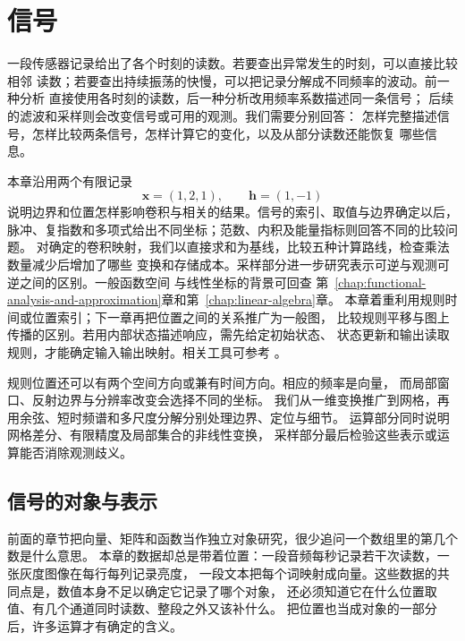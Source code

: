 \chapter{信号}
\label{chap:signal-analysis}

一段传感器记录给出了各个时刻的读数。若要查出异常发生的时刻，可以直接比较相邻
读数；若要查出持续振荡的快慢，可以把记录分解成不同频率的波动。前一种分析
直接使用各时刻的读数，后一种分析改用频率系数描述同一条信号；
后续的滤波和采样则会改变信号或可用的观测。我们需要分别回答：
怎样完整描述信号，怎样比较两条信号，怎样计算它的变化，以及从部分读数还能恢复
哪些信息。

本章沿用两个有限记录
\begin{equation}
  \bm x=(1,2,1),\qquad \bm h=(1,-1)
  \label{eq:signal-analysis-running-example}
\end{equation}
说明边界和位置怎样影响卷积与相关的结果。信号的索引、取值与边界确定以后，
脉冲、复指数和多项式给出不同坐标；范数、内积及能量指标则回答不同的比较问题。
对确定的卷积映射，我们以直接求和为基线，比较五种计算路线，检查乘法数量减少后增加了哪些
变换和存储成本。采样部分进一步研究表示可逆与观测可逆之间的区别。一般函数空间
与线性坐标的背景可回查
第~\ref{chap:functional-analysis-and-approximation}章和第~\ref{chap:linear-algebra}章。
本章着重利用规则时间或位置索引；下一章再把位置之间的关系推广为一般图，
比较规则平移与图上传播的区别。若用内部状态描述响应，需先给定初始状态、
状态更新和输出读取规则，才能确定输入输出映射。相关工具可参考
。

规则位置还可以有两个空间方向或兼有时间方向。相应的频率是向量，
而局部窗口、反射边界与分辨率改变会选择不同的坐标。
我们从一维变换推广到网格，再用余弦、短时频谱和多尺度分解分别处理边界、定位与细节。
运算部分同时说明网格差分、有限精度及局部集合的非线性变换，
采样部分最后检验这些表示或运算能否消除观测歧义。

\section{信号的对象与表示}
\label{sec:signal-objects-structure}

前面的章节把向量、矩阵和函数当作独立对象研究，很少追问一个数组里的第几个数是什么意思。
本章的数据却总是带着位置：一段音频每秒记录若干次读数，一张灰度图像在每行每列记录亮度，
一段文本把每个词映射成向量。这些数据的共同点是，数值本身不足以确定它记录了哪个对象，
还必须知道它在什么位置取值、有几个通道同时读数、整段之外又该补什么。
把位置也当成对象的一部分后，许多运算才有确定的含义。

